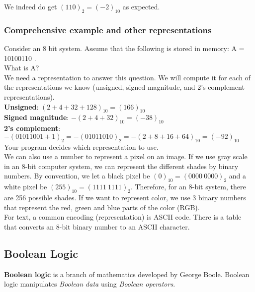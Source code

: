 \documentclass[]{article}
\begin{document}
We indeed do get $(110)_2 = (-2)_{10}$ as expected.

\subsubsection{Comprehensive example and other representations}
\bigbreak

Consider an 8 bit system. Assume that the following is stored in memory:  A = 10100110 .\\

What is A?\\

We need a representation to answer this question. We will compute it for each of the representations we know (unsigned, signed magnitude, and 2's complement representations).\\

\textbf{Unsigned}: $(2 + 4 + 32 + 128)_{10} = (166)_{10}$\\

\textbf{Signed magnitude}: $-(2 + 4 + 32)_{10} = (-38)_{10}$\\

\textbf{2's complement}: $-(01011001 + 1)_2 = -(01011010)_2 = -(2 + 8 + 16 + 64)_{10} = (-92)_{10}$\\

Your program decides which representation to use.\\

We can also use a number to represent a pixel on an image. If we use gray scale in an 8-bit computer system, we can represent the different shades by binary numbers. By convention, we let a black pixel be $(0)_{10} = (0000~0000)_2$ and a white pixel be $(255)_{10} = (1111~1111)_2$. Therefore, for an 8-bit system, there are 256 possible shades. If we want to represent color, we use 3 binary numbers that represent the red, green and blue parts of the color (RGB).\\

For text, a common encoding (representation) is ASCII code. There is a table that converts an 8-bit binary number to an ASCII character. 


\subsection{Boolean Logic}
\bigbreak

\textbf{Boolean logic} is a branch of mathematics developed by George Boole. Boolean logic manipulates \textit{Boolean data} using \textit{Boolean operators}.\\
\end{document}
